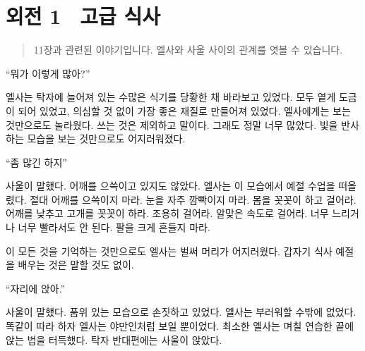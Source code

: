 

\chapter[외전1. 고급 식사][외전 1\hspace*{.5em}고급 식사]{외전 1 \ 고급 식사}



\begin{quote}

\small 11장과 관련된 이야기입니다. 엘사와 사울 사이의 관계를 엿볼 수 있습니다.

\end{quote} %

``뭐가 이렇게 많아?''

엘사는 탁자에 늘어져 있는 수많은 식기를 당황한 채 바라보고 있었다. 모두 옅게 도금이 되어 있었고, 의심할 것 없이 가장 좋은 재질로 만들어져 있었다. 엘사에게는 보는 것만으로도 놀라웠다. 쓰는 것은 제외하고 말이다. 그래도 정말 너무 많았다. 빛을 반사하는 모습을 보는 것만으로도 어지러워졌다.

``좀 많긴 하지''

사울이 말했다. 어깨를 으쓱이고 있지도 않았다. 엘사는 이 모습에서 예절 수업을 떠올렸다. 절대 어깨를 으쓱이지 마라. 눈을 자주 깜빡이지 마라. 몸을 꼿꼿이 하고 걸어라. 어깨를 낮추고 고개를 꼿꼿이 하라. 조용히 걸어라. 알맞은 속도로 걸어라. 너무 느리거나 너무 빨라서도 안 된다. 팔을 크게 흔들지 마라.

이 모든 것을 기억하는 것만으로도 엘사는 벌써 머리가 어지러웠다. 갑자기 식사 예절을 배우는 것은 말할 것도 없이.

``자리에 앉아.''

사울이 말했다. 품위 있는 모습으로 손짓하고 있었다. 엘사는 부러워할 수밖에 없었다. 똑같이 따라 하자 엘사는 야만인처럼 보일 뿐이었다. 최소한 엘사는 며칠 연습한 끝에 앉는 법을 터득했다. 탁자 반대편에는 사울이 앉았다.

